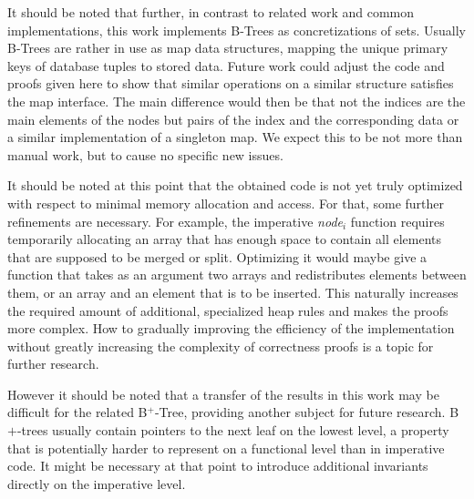 It should be noted that further,
in contrast to related work and common implementations,
this work implements B-Trees as concretizations of sets.
Usually B-Trees are rather in use as map data structures,
mapping the unique primary keys
of database tuples to stored data.
Future work could adjust the code and proofs given here
to show that similar operations on a similar structure satisfies
the map interface.
The main difference would then be that not the indices
are the main elements of the nodes but pairs of the 
index and the corresponding data or a similar
implementation of a singleton map.
We expect this to be not more than manual work,
but to cause no specific new issues.

It should be noted at this point that the obtained code is not yet
truly optimized with respect to minimal memory allocation and access.
For that, some further refinements are necessary.
For example, the imperative \textit{node$_i$} function
requires temporarily allocating
an array that has enough space to contain
all elements that are supposed to be merged or split.
Optimizing it would maybe give a function that takes
as an argument two arrays and redistributes elements between them,
or an array and an element that is to be inserted.
This naturally increases the required amount of additional,
specialized heap rules and makes the proofs more complex.
How to gradually improving the efficiency of the implementation
without greatly increasing the complexity of correctness
proofs is a topic for further research.


However it should be noted that a transfer of the results in
this work may be difficult for the related B$^+$-Tree,
providing another subject for future research.
B$+$-trees usually contain pointers to the next leaf
on the lowest level, a property that is potentially harder
to represent on a functional level than in imperative code.
It might be necessary at that point to introduce additional
invariants directly on the imperative level.